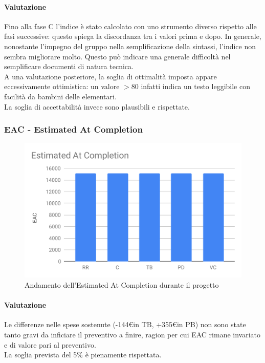 \paragraph*{Valutazione}
Fino alla fase C l'indice è stato calcolato con uno strumento diverso rispetto alle fasi successive: questo spiega la discordanza tra i valori prima e dopo.
In generale, nonostante l'impegno del gruppo nella semplificazione della sintassi, l'indice non sembra migliorare molto.
Questo può indicare una generale difficoltà nel semplificare documenti di natura tecnica.\\
A una valutazione posteriore, la soglia di ottimalità imposta appare eccessivamente ottimistica: un valore $>80$ infatti indica un testo leggibile con facilità da bambini delle elementari.\\
La soglia di accettabilità invece sono plausibili e rispettate. 


\subsubsection{EAC - Estimated At Completion}
\begin{figure}[H]
	\centering
	\includegraphics[scale=0.7]{res/images/RA/eac.pdf}
	\caption{Andamento dell'Estimated At Completion durante il progetto}
\end{figure}
\paragraph*{Valutazione}
Le differenze nelle spese sostenute (-144\euro in TB, +355\euro in PB) non sono state tanto gravi da inficiare il preventivo a finire, ragion per cui EAC rimane invariato e di valore pari al preventivo.\\
La soglia prevista del 5\% è pienamente rispettata.

